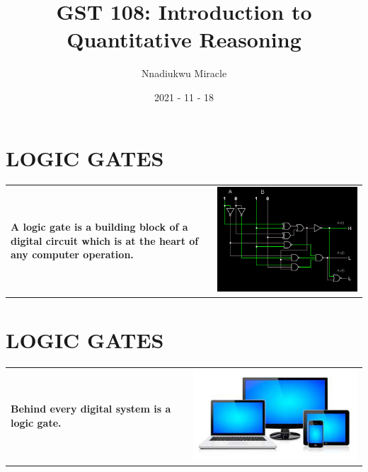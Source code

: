 \documentclass{article}
\title{GST 108: Introduction to Quantitative Reasoning}
\date{2021 - 11 - 18}
\author{Nnadiukwu Miracle}
\begin{document}
	\pagecolor{white}
	\maketitle
	\newpage
	\centering
	\section*{LOGIC GATES}
		\begin{table}[h!]
			\begin{tabular}{m{4cm} m{10cm}}
				\color{blue}
				{\LARGE\textbf{A logic gate is a building block of a digital circuit which is at the heart of any computer operation.}}	 & \includegraphics[width=1\linewidth]{circuit.png} \\
			\end{tabular}
		\end{table}
	\newpage
	\section*{LOGIC GATES}
	\begin{table}[h!]
		\begin{tabular}{m{4cm} m{10cm}}
			\color{blue}
			{\LARGE\textbf{Behind every digital system is a logic gate.
			}}	 & \includegraphics[width=1\linewidth]{devices.jpg} \\
		\end{tabular}
	\end{table}
\newpage
\end{document}
